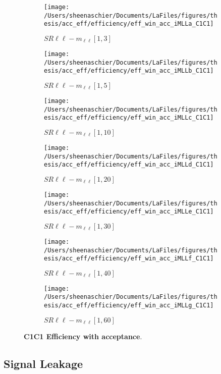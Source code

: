 \begin{figure}
        \centering
    \begin{subfigure}[b]{0.44\textwidth}
        \texttt{[image: /Users/sheenaschier/Documents/LaFiles/figures/thesis/acc\_eff/efficiency/eff\_win\_acc\_iMLLa\_C1C1]}
    \caption{$SR\ell\ell-m_{\ell\ell} [1, 3]$}
    \end{subfigure}
    \begin{subfigure}[b]{0.44\textwidth}
        \texttt{[image: /Users/sheenaschier/Documents/LaFiles/figures/thesis/acc\_eff/efficiency/eff\_win\_acc\_iMLLb\_C1C1]}
    \caption{$SR\ell\ell-m_{\ell\ell} [1, 5]$}
    \end{subfigure}
    \begin{subfigure}[b]{0.44\textwidth}
        \texttt{[image: /Users/sheenaschier/Documents/LaFiles/figures/thesis/acc\_eff/efficiency/eff\_win\_acc\_iMLLc\_C1C1]}
    \caption{$SR\ell\ell-m_{\ell\ell} [1, 10]$}
    \end{subfigure}
    \begin{subfigure}[b]{0.44\textwidth}
        \texttt{[image: /Users/sheenaschier/Documents/LaFiles/figures/thesis/acc\_eff/efficiency/eff\_win\_acc\_iMLLd\_C1C1]}
    \caption{$SR\ell\ell-m_{\ell\ell} [1, 20]$}
    \end{subfigure}
    \begin{subfigure}[b]{0.44\textwidth}
        \texttt{[image: /Users/sheenaschier/Documents/LaFiles/figures/thesis/acc\_eff/efficiency/eff\_win\_acc\_iMLLe\_C1C1]}
    \caption{$SR\ell\ell-m_{\ell\ell} [1, 30]$}
    \end{subfigure}
    \begin{subfigure}[b]{0.44\textwidth}
        \texttt{[image: /Users/sheenaschier/Documents/LaFiles/figures/thesis/acc\_eff/efficiency/eff\_win\_acc\_iMLLf\_C1C1]}
    \caption{$SR\ell\ell-m_{\ell\ell} [1, 40]$}
    \end{subfigure}
    \begin{subfigure}[b]{0.44\textwidth}
        \texttt{[image: /Users/sheenaschier/Documents/LaFiles/figures/thesis/acc\_eff/efficiency/eff\_win\_acc\_iMLLg\_C1C1]}
    \caption{$SR\ell\ell-m_{\ell\ell} [1, 60]$}
    \end{subfigure}
    \caption{\label{fig:c1c1_efficiency_in_acceptance}\textbf{C1C1 Efficiency with acceptance}.}
\end{figure}

\FloatBarrier
\subsection{Signal Leakage}

